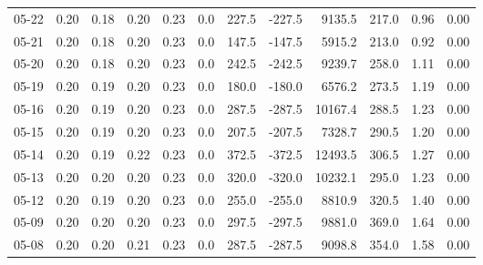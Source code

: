 \begin{threeparttable}
{\begin{tabular}{lrrrrrrrrrrr}
  05-22 &          0.20 &          0.18 &          0.20 &        0.23 &                 0.0 &               227.5 &     -227.5 &              9135.5 &            217.0 &            0.96 &                   0.00 \\
  05-21 &          0.20 &          0.18 &          0.20 &        0.23 &                 0.0 &               147.5 &     -147.5 &              5915.2 &            213.0 &            0.92 &                   0.00 \\
  05-20 &          0.20 &          0.18 &          0.20 &        0.23 &                 0.0 &               242.5 &     -242.5 &              9239.7 &            258.0 &            1.11 &                   0.00 \\
  05-19 &          0.20 &          0.19 &          0.20 &        0.23 &                 0.0 &               180.0 &     -180.0 &              6576.2 &            273.5 &            1.19 &                   0.00 \\
  05-16 &          0.20 &          0.19 &          0.20 &        0.23 &                 0.0 &               287.5 &     -287.5 &             10167.4 &            288.5 &            1.23 &                   0.00 \\
  05-15 &          0.20 &          0.19 &          0.20 &        0.23 &                 0.0 &               207.5 &     -207.5 &              7328.7 &            290.5 &            1.20 &                   0.00 \\
  05-14 &          0.20 &          0.19 &          0.22 &        0.23 &                 0.0 &               372.5 &     -372.5 &             12493.5 &            306.5 &            1.27 &                   0.00 \\
  05-13 &          0.20 &          0.20 &          0.20 &        0.23 &                 0.0 &               320.0 &     -320.0 &             10232.1 &            295.0 &            1.23 &                   0.00 \\
  05-12 &          0.20 &          0.19 &          0.20 &        0.23 &                 0.0 &               255.0 &     -255.0 &              8810.9 &            320.5 &            1.40 &                   0.00 \\
  05-09 &          0.20 &          0.20 &          0.20 &        0.23 &                 0.0 &               297.5 &     -297.5 &              9881.0 &            369.0 &            1.64 &                   0.00 \\
  05-08 &          0.20 &          0.20 &          0.21 &        0.23 &                 0.0 &               287.5 &     -287.5 &              9098.8 &            354.0 &            1.58 &                   0.00 \\

\end{tabular}}
\end{threeparttable}
